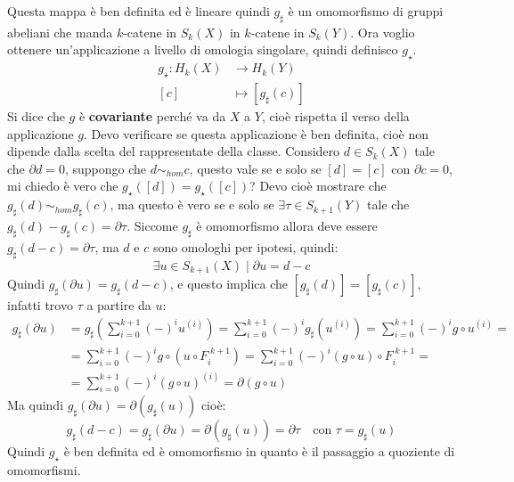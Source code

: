 \documentclass[10pt, twoside=false, x11names]{scrbook}
\begin{document}
Questa mappa è ben definita ed è lineare quindi $ g_\sharp $ è un omomorfismo di
gruppi abeliani che manda $ k $-catene in $ S_k(X) $ in $ k $-catene
in $ S_k(Y) $.
Ora voglio ottenere un'applicazione a livello di omologia singolare,
quindi definisco $ g_\star $.
\begin{align*}
  g_\star \colon H_k(X) & \to H_k(Y) \\
  [c]          & \mapsto [g_\sharp (c)]
\end{align*}
Si dice che $ g $ è \textbf{covariante} perché va da $ X $ a $ Y $,
cioè rispetta il verso della applicazione $ g $.
Devo verificare se questa applicazione è ben definita, cioè non
dipende dalla scelta del rappresentate della classe.
Considero $ d \in S_k(X) $ tale che $ \partial d = 0 $, suppongo
che $ d \sim_{hom} c $, questo vale se e solo se $ [d] = [c] $ con $ \partial c = 0 $,
mi chiedo è vero che $ g_\star([d]) = g_\star([c]) $?
Devo cioè mostrare che $ g_\sharp (d) \sim_{hom} g_\sharp (c) $, ma questo è vero
se e solo se $ \exists \tau \in S_{k+1}(Y) $ tale che $ g_\sharp(d) - g_\sharp (c) = \partial \tau $.
Siccome $ g_\sharp $ è omomorfismo allora deve essere $ g_\sharp (d - c) = \partial \tau $,
ma $ d $ e $ c $ sono omologhi per ipotesi, quindi:
\[
  \exists u \in S_{k+1}(X) \; | \; \partial u = d - c
\]
Quindi $ g_\sharp(\partial u) = g_\sharp (d - c) $, e questo implica che $ [g_\sharp (d)] = [g_\sharp(c)] $, infatti
trovo $ \tau $ a partire da $ u $:
\begin{align*}
  g_\sharp (\partial u) & = g_\sharp \left(\sum_{i = 0}^{k+1} (-)^i u^{(i)}\right) = \sum_{i=0}^{k+1}(-)^i g_\sharp (u^{(i)}) =
              \sum_{i=0}^{k+1}(-)^i g \circ u^{(i)} = \\
            & = \sum_{i = 0}^{k+1} (-)^i g \circ \left( u \circ F_i^{\; k+1} \right) =
              \sum_{i = 0}^{k+1} (-)^i  \left( g \circ u \right) \circ F_i^{\; k+1} = \\
            & = \sum_{i = 0}^{k+1}(-)^i \left( g \circ u \right)^{(i)} = \partial \left( g \circ u \right)
\end{align*}
Ma quindi $ g_\sharp(\partial u) = \partial (g_\sharp (u)) $ cioè:
\[
  g_\sharp(d-c) = g_\sharp (\partial u) = \partial (g_\sharp (u)) = \partial \tau \quad \text{con } \tau = g_\sharp(u)
\]
Quindi $ g_\star $ è ben definita ed è omomorfismo in quanto
è il passaggio a quoziente di omomorfismi.
\end{document}
